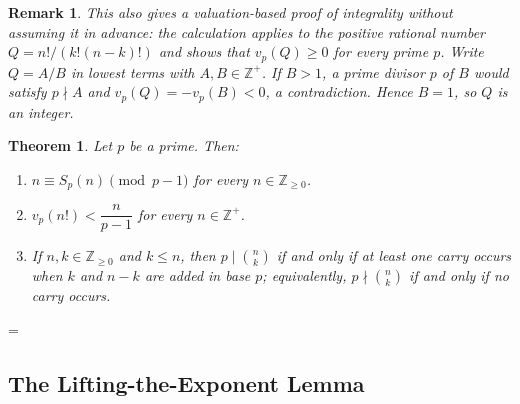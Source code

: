 \documentclass[11pt]{article}
\makeatletter
\let\nt@closedisplay\]
\def\nt@guardedclose{\@ifnextchar\par{\nt@closeafterpar}{\@ifnextchar\end{\postdisplaypenalty\@M\nt@closedisplay}{\nt@closedisplay}}}
\def\nt@closeafterpar\par{\@ifnextchar\par{\nt@closeafterpar}{\@ifnextchar\end{\postdisplaypenalty\@M\nt@closedisplay\par}{\nt@closedisplay\par}}}
\renewenvironment{proof}[1][\proofname]{\par
  \pushQED{\qed}\normalfont\topsep\medskipamount\edef\nt@afterproof{\@endparpenalty=\the\@endparpenalty\relax}\@beginparpenalty\@M\@endparpenalty\@M\let\]\nt@guardedclose\trivlist\item[]\textit{#1\@addpunct{.}} \ignorespaces}{\ifvmode\addpenalty\@M\fi\popQED\nt@afterproof\endtrivlist\@endpefalse}
\theoremstyle{ntstyle}
\newtheorem{theorem}{Theorem}[subsection]
\newtheorem*{remark}{Remark}
\makeatother
\begin{document}
\begin{remark}
  This also gives a valuation-based proof of integrality without assuming it in
  advance: the calculation applies to the positive rational number
  $Q=n!/(k!(n-k)!)$ and shows that $v_p(Q)\ge0$ for every prime $p$.
  Write $Q=A/B$ in lowest terms with $A,B\in\mathbb{Z}^+$.
  If $B>1$, a prime divisor $p$ of $B$ would satisfy $p\nmid A$ and
  $v_p(Q)=-v_p(B)<0$, a contradiction. Hence $B=1$, so $Q$ is an integer.

\end{remark}

\begin{theorem}\label{thm:4.7.4} Let $p$ be a prime. Then:

  \begin{enumerate}[label={\alph*)}]
    \item $n\equiv S_p(n)\pmod{p-1}$ for every
          $n\in\mathbb{Z}_{\ge0}$.
    \item $v_p(n!)<\dfrac{n}{p-1}$ for every $n\in\mathbb{Z}^+$.
    \item If $n,k\in\mathbb{Z}_{\ge0}$ and $k\le n$, then
          $p\mid\binom{n}{k}$ if and only if at least one carry occurs when $k$
          and $n-k$ are added in base $p$; equivalently,
          $p\nmid\binom{n}{k}$ if and only if no carry occurs.
  \end{enumerate}

\end{theorem}

\begin{proof}

\end{proof}
\subsection{The Lifting-the-Exponent Lemma}
\end{document}
